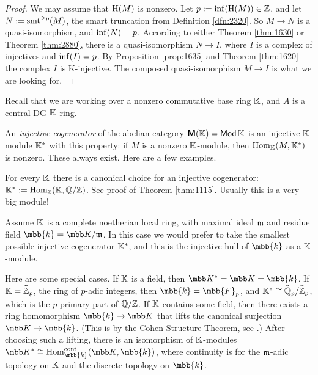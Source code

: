 \begin{proof}
We may assume that $\operatorname{H}(M)$ is nonzero. Let 
$p := \operatorname{inf}(\operatorname{H}(M)) \in \mathbb{Z}$, and let 
$N := \operatorname{smt}^{\geq p}(M)$, the smart truncation from 
Definition \ref{dfn:2320}. So $M \to N$ is a quasi-isomorphism, and 
$\operatorname{inf}(N) = p$. 
According to either Theorem \ref{thm:1630} or Theorem \ref{thm:2880},
there is a quasi-isomorphism $N \to I$, where $I$ is a complex 
of injectives and $\operatorname{inf}(I) = p$. 
By Proposition \ref{prop:1635} and Theorem \ref{thm:1620} the complex $I$ is 
K-injective. The composed quasi-isomorphism $M \to I$ is what we are looking 
for. 
\end{proof}




\label{subsec:exis-K-inj-dgmods}

Recall that we are working over a non\-zero commutative base ring $\mathbb{K}$, and 
$A$ is a central DG $\mathbb{K}$-ring. 

An {\em injective cogenerator} of the abelian category
$\boldsymbol{\mathsf{M}}(\mathbb{K}) = \operatorname{\mathsf{Mod}} \mathbb{K}$ is an injective 
$\mathbb{K}$-module $\mathbb{K}^*$ with this property: if $M$ is a nonzero $\mathbb{K}$-module, then 
$\operatorname{Hom}_{\mathbb{K}}(M, \mathbb{K}^*)$ is nonzero. These always exist. Here are a few 
examples. 

\begin{exa} \label{exa:1665} 
For every $\mathbb{K}$ there is a canonical choice for an injective cogenerator: 
$\mathbb{K}^* := \operatorname{Hom}_{\mathbb{Z}}(\mathbb{K}, \mathbb{Q} / \mathbb{Z})$.
See proof of Theorem \ref{thm:1115}.
Usually this is a very big module! 
\end{exa}

\begin{exa} \label{exa:1876}
Assume $\mathbb{K}$ is a complete noetherian local ring, with maximal ideal 
$\mathfrak{m}$ and residue field $\mbb{k} = \K / \m$. In this case we would prefer to take
the smallest possible injective cogenerator $\mathbb{K}^*$, and this is the injective 
hull of $\mbb{k}$ as a $\mathbb{K}$-module. 

Here are some special cases. 
If $\mathbb{K}$ is a field, then $\K^* = \K = \mbb{k}$. 
If $\mathbb{K} = \widehat{\mathbb{Z}}_p$, the ring of $p$-adic integers, then 
$\mbb{k} = \mbb{F}_p$, and $\mathbb{K}^* \cong \widehat{\mathbb{Q}}_p / \widehat{\mathbb{Z}}_p$, which is the 
$p$-primary part of $\mathbb{Q} / \mathbb{Z}$. 
If $\mathbb{K}$ contains some field, then there exists a ring homomorphism 
$\mbb{k} \to \K$ that lifts the canonical surjection $\K \to \mbb{k}$.
(This is by the Cohen Structure Theorem, see \cite[Theorem 7.7]{Eis}.)
After choosing such a lifting, there is an isomorphism of $\mathbb{K}$-modules 
$\K^* \cong \opn{Hom}^{\mrm{cont}}_{\mbb{k}}(\K, \mbb{k})$,
where continuity is for the $\mathfrak{m}$-adic topology on $\mathbb{K}$ and the discrete 
topology on $\mbb{k}$. 
\end{exa}

